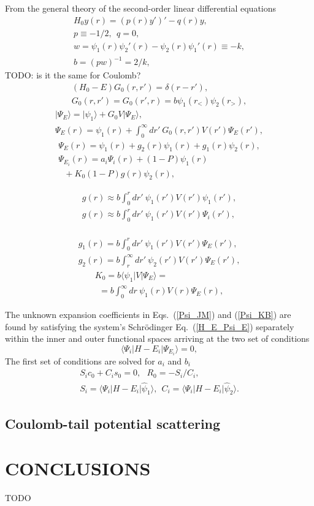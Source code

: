 \documentclass[aip
, pra
, showpacs
, aps
, twocolumn
, groupedaddress
, floatfix
]{revtex4}
\newcommand{\beq}{\begin{equation}}
\newcommand{\eeq}{\end{equation}}
\newcommand{\barr}{\begin{array}}
\newcommand{\earr}{\end{array}}
\begin{document}
From the general theory of the second-order linear differential equations
\beq \barr{l}
H_0 y(r) = (p(r) y')' - q(r) y,\\
p \equiv -1/2, \ \ q = 0,\\
w = \psi_1(r) \psi_2'(r) - \psi_2(r) \psi_1'(r) \equiv -k,\\
b = (pw)^{-1}= 2/k,
\earr \eeq
TODO: is it the same for Coulomb?
\beq \barr{l}
(H_0 - E) G_0(r,r') = \delta(r-r'),\\
G_0(r,r') = G_0(r',r) = b \psi_1(r_{<}) \psi_2(r_{>}), 
\earr \eeq
\beq \barr{l}
| \Psi_E \rangle = | \psi_1 \rangle + G_0 V |\Psi_E \rangle,\\
\Psi_E(r) = \psi_1(r) +  \int_0^\infty dr'\ G_0(r,r') V(r') \Psi_E(r'),
\earr \eeq
\beq \barr{l}
\Psi_E(r) = \psi_1(r) +  g_2(r) \psi_1(r) + g_1(r) \psi_2(r),\\
\Psi_{E_i}(r) = a_i \Psi_i(r)  + (1-P)\psi_1(r)  \\
\ \ \ + K_0 (1-P)g(r)\psi_2(r),
\earr \eeq

\beq \barr{l}
g(r) \approx b \int_0^r dr'\ \psi_1(r') V(r') \psi_1(r'), \\
g(r) \approx b \int_0^r dr'\ \psi_1(r') V(r') \Psi_i(r'), \\
\earr \eeq

\beq \barr{l}
g_1(r) = b \int_0^r dr'\ \psi_1(r') V(r') \Psi_E(r'), \\
g_2(r) = b \int_r^\infty dr'\ \psi_2(r') V(r') \Psi_E(r'),
\earr \eeq
\beq \barr{l}
K_0 = b \langle \psi_1 | V | \Psi_E \rangle =\\
\ \ = b \int_0^\infty  dr\ \psi_1(r) V(r) \Psi_E(r),
\earr \eeq




The unknown expansion coefficients in Eqs.~(\ref{Psi_JM}) and (\ref{Psi_KB})
are found by satisfying the system's  Schr\"odinger Eq.~(\ref{H_E_Psi_E})
separately within the inner and outer functional spaces
arriving at the two set of conditions
\beq
\langle\Psi_i|H-E_i|\Psi_{E_i}\rangle=0,
\eeq
The first set of conditions are solved for $a_i$ and $b_i$
\beq \barr{l}
S_i c_0 + C_i s_0 = 0, \ \ \
R_0 = - S_i / C_i, \\
S_i = \langle\Psi_i|H-E_i|  \hat{\psi}_1 \rangle, \ \
C_i = \langle\Psi_i|H-E_i|  \hat{\psi}_2 \rangle.
\earr \eeq






\subsection{Coulomb-tail potential scattering}



\section{CONCLUSIONS}
TODO


\begin{acknowledgments}
\end{acknowledgments}





%
\end{document}
